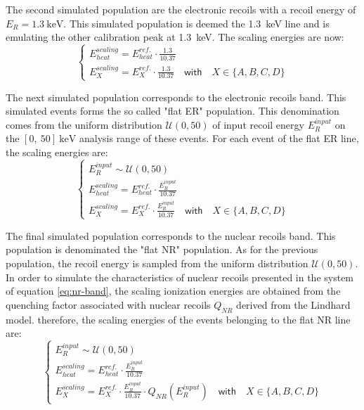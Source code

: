 The second simulated population are the electronic recoils with a recoil energy of $E_R = \SI{1.3}{\kilo\eV}$.  This simulated population is deemed the \SI{1.3}{\kilo\eV} line and is emulating the other calibration peak at \SI{1.3}{\kilo\eV}. The scaling energies are now:
\begin{equation}
\begin{cases}
\displaystyle
E_{heat}^{scaling} = E_{heat}^{ref.} \cdot \frac{1.3}{10.37}
\\
\displaystyle
E_{X}^{scaling} = E_{X}^{ref.} \cdot \frac{1.3}{10.37} \quad \textsf{with} \quad X \in \{A,B,C,D\}
\end{cases}
\end{equation}

The next simulated population corresponds to the electronic recoils band. This simulated events forms the so called "flat ER" population. This denomination comes from the uniform distribution $\mathcal{U}(0,50)$ of input recoil energy $E_R^{input}$ on the $[0,\ 50]\ \si{\kilo\eV}$ analysis range of these events.
For each event of the flat ER line, the scaling energies are:
\begin{equation}
\begin{cases}
\displaystyle
E_R^{input} \sim \mathcal{U}(0,50)
\\
\displaystyle
E_{heat}^{scaling} = E_{heat}^{ref.} \cdot \frac{E_R^{input}}{10.37}
\\
\displaystyle
E_{X}^{scaling} = E_{X}^{ref.} \cdot \frac{E_R^{input}}{10.37} \quad \textsf{with} \quad X \in \{A,B,C,D\}
\end{cases}
\end{equation}

The final simulated population corresponds to the nuclear recoils band. This population is denominated the "flat NR" population. As for the previous population, the recoil energy is sampled from the uniform distribution $\mathcal{U}(0,50)$. In order to simulate the characteristics of nuclear recoils presented in the system of equation \ref{eq:nr-band}, the scaling ionization energies are obtained from the quenching factor associated with nuclear recoils $Q_{NR}$ derived from the Lindhard model. therefore, the scaling energies of the events belonging to the flat NR line are:
\begin{equation}
\begin{cases}
\displaystyle 
E_R^{input} \sim \mathcal{U}(0,50)
\\
\displaystyle
E_{heat}^{scaling} = E_{heat}^{ref.} \cdot \frac{E_R^{input}}{10.37}
\\
\displaystyle
E_{X}^{scaling} = E_{X}^{ref.} \cdot \frac{E_R^{input}}{10.37}  \cdot Q_{NR} \left( E_R^{input} \right)
\quad \textsf{with} \quad X \in \{A,B,C,D\}
\end{cases}
\end{equation}

